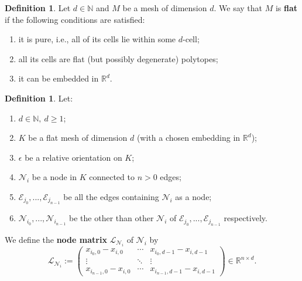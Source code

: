 \documentclass[fleqn]{article}
\theoremstyle{definition}
\newtheorem{definition}[theorem]{Definition}
\newcommand{\N}{\mathbb{N}}
\newcommand{\R}{\mathbb{R}}
\begin{document}
\begin{definition}
  Let $d\in \N$ and $M$ be a mesh of dimension $d$.
  We say that $M$ is \textbf{flat} if the following conditions are satisfied:
  \begin{enumerate}
    \item
      it is pure, i.e., all of its cells lie within some $d$-cell;
    \item
      all its cells are flat (but possibly degenerate) polytopes;
    \item
      it can be embedded in $\R^d$.
  \end{enumerate}
\end{definition}

\begin{definition}
  Let:
  \begin{enumerate}
    \item
      $d \in \N,\ d \geq 1$;
    \item
      $K$ be a flat mesh of dimension $d$
      (with a chosen embedding in $\R^d$);
    \item
      $\epsilon$ be a relative orientation on $K$;
    \item
      $\mathcal{N}_i$ be a node in $K$ connected to $n > 0$ edges;
    \item
      $\mathcal{E}_{j_0}, ..., \mathcal{E}_{j_{n - 1}}$ be all the edges
      containing $\mathcal{N}_i$ as a node;
    \item
      $\mathcal{N}_{i_0}, ..., \mathcal{N}_{i_{n - 1}}$ be the other than
      other $\mathcal{N}_i$ of
      $\mathcal{E}_{j_0}, ..., \mathcal{E}_{j_{n - 1}}$ respectively.
  \end{enumerate}
  We define the \textbf{node matrix} $\mathcal{L}_{\mathcal{N}_i}$ of
  $\mathcal{N}_i$ by
  \begin{equation}
    \mathcal{L}_{\mathcal{N}_i} :=
    \begin{pmatrix}
      x_{i_0, 0} - x_{i, 0} & \cdots & x_{i_0, d - 1} - x_{i, d - 1} \\
      \vdots & \ddots & \vdots \\
      x_{i_{n - 1}, 0} - x_{i, 0} & \cdots & x_{i_{n - 1}, d - 1} - x_{i, d - 1}
    \end{pmatrix}
    \in \R^{n \times d}.
  \end{equation}
\end{definition}
\end{document}
